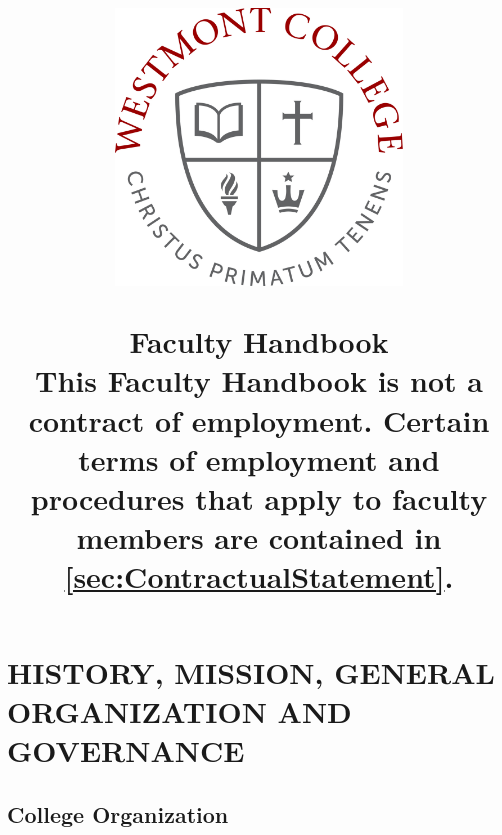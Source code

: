 \documentclass[letterpaper, 11pt]{article}
\date{}
\author{}
\title{
\begin{center}
\includegraphics[width=3in]{images/WestmontSeal.jpg}
\end{center}
\vspace{1in}
{\bfseries \Huge Faculty Handbook }\\
\vspace{1in}
This Faculty Handbook is not a contract of employment.  Certain terms of employment and procedures that apply to faculty members are contained in \autoref{sec:ContractualStatement}.
}
\begin{document}
\fancyhf{} %
\cfoot{\bf -- \thepage\ --}

\renewcommand{\contentsname}{Table of Contents}

\maketitle

\thispagestyle{empty}

\clearpage

\tableofcontents


\setcounter{page}{1}

\clearpage



\setcounter{page}{1} 

\section{HISTORY, MISSION, GENERAL ORGANIZATION AND GOVERNANCE}


\subsection{College Organization}
\end{document}
